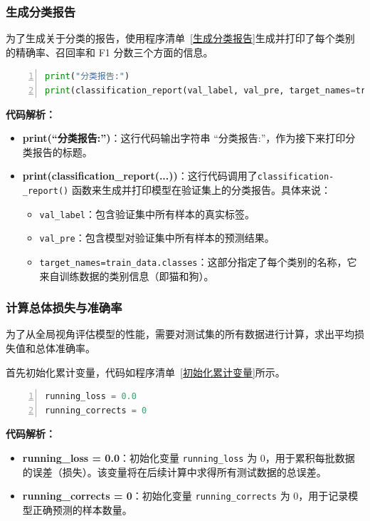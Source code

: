 \subsubsection{生成分类报告}
为了生成关于分类的报告，使用程序清单~\ref{生成分类报告}生成并打印了每个类别的精确率、召回率和 F1 分数三个方面的信息。
\begin{lstlisting}[language={python},label={生成分类报告},caption={生成分类报告}, basicstyle=\footnotesize\ttfamily, breaklines=true, numbers=left, frame=single,keepspaces=true,showstringspaces=false]
print("分类报告:")
print(classification_report(val_label, val_pre, target_names=train_data.classes))
\end{lstlisting}
\textbf{代码解析：}
\begin{itemize}
    \item \textbf{print(“分类报告:”)}：这行代码输出字符串 “分类报告:”，作为接下来打印分类报告的标题。

    \item \textbf{print(classification\_report(...))}：这行代码调用了\texttt{classification-\\\_report()} 函数来生成并打印模型在验证集上的分类报告。具体来说：
\begin{itemize}
    \item \texttt{val\_label}：包含验证集中所有样本的真实标签。
    \item \texttt{val\_pre}：包含模型对验证集中所有样本的预测结果。
    \item \texttt{target\_names=train\_data.classes}：这部分指定了每个类别的名称，它来自训练数据的类别信息（即猫和狗）。
\end{itemize}
\end{itemize}

\subsubsection{计算总体损失与准确率}
为了从全局视角评估模型的性能，需要对测试集的所有数据进行计算，求出平均损失值和总体准确率。

首先初始化累计变量，代码如程序清单~\ref{初始化累计变量}所示。
\begin{lstlisting}[language={python},label={初始化累计变量},caption={初始化累计变量}, basicstyle=\footnotesize\ttfamily, breaklines=true, numbers=left, frame=single]
running_loss = 0.0
running_corrects = 0
\end{lstlisting}
\textbf{代码解析：}
\begin{itemize}
    \item \textbf{running\_loss = 0.0}：初始化变量 \texttt{running\_loss} 为 0，用于累积每批数据的误差（损失）。该变量将在后续计算中求得所有测试数据的总误差。

    \item \textbf{running\_corrects = 0}：初始化变量 \texttt{running\_corrects} 为 0，用于记录模型正确预测的样本数量。

\end{itemize}

